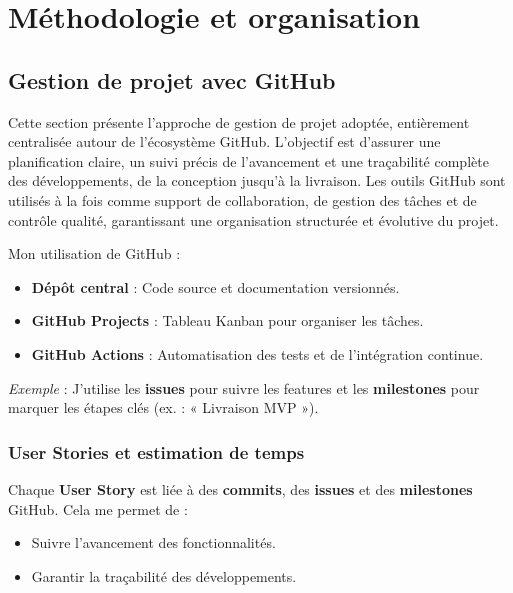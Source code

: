 \chapter{Méthodologie et organisation}

\section{Gestion de projet avec GitHub}

Cette section présente l’approche de gestion de projet adoptée, entièrement centralisée autour de l’écosystème GitHub.  
L’objectif est d’assurer une planification claire, un suivi précis de l’avancement et une traçabilité complète des développements, de la conception jusqu’à la livraison.
\newline
Les outils GitHub sont utilisés à la fois comme support de collaboration, de gestion des tâches et de contrôle qualité, garantissant une organisation structurée et évolutive du projet.
\newline

\begin{for_you}{Mon utilisation de GitHub :}
    \begin{itemize}
        \item \textbf{Dépôt central} : Code source et documentation versionnés.
        \item \textbf{GitHub Projects} : Tableau Kanban pour organiser les tâches.
        \item \textbf{GitHub Actions} : Automatisation des tests et de l’intégration continue.
    \end{itemize}

    \textit{Exemple} :
    J’utilise les \textbf{issues} pour suivre les features et les \textbf{milestones} pour marquer les étapes clés (ex. : « Livraison MVP »).
\end{for_you}

\subsection{User Stories et estimation de temps}

Chaque \textbf{User Story} est liée à des \textbf{commits}, des \textbf{issues} et des \textbf{milestones} GitHub.
Cela me permet de :
\begin{itemize}
    \item Suivre l’avancement des fonctionnalités.
    \item Garantir la traçabilité des développements.
    \newline
\end{itemize}


